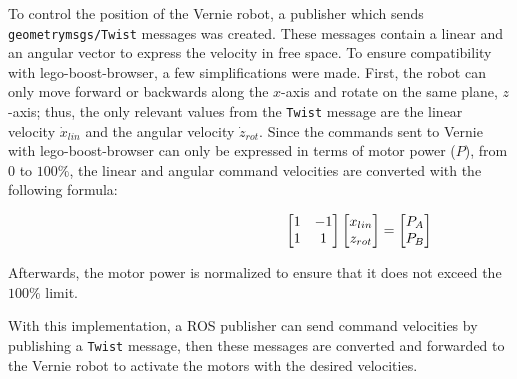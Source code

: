         To control the position of the Vernie robot, a publisher which sends \texttt{geometry\smallunderscore msgs/Twist} messages was created. These messages contain a linear and an angular vector to express the velocity in free space. To ensure compatibility with \textsf{lego-boost-browser}, a few simplifications were made. First, the robot can only move forward or backwards along the $x$-axis and rotate on the same plane, $z$-axis; thus, the only relevant values from the \texttt{Twist} message are the linear velocity $\dot{x}_{lin}$ and the angular velocity $\dot{z}_{rot}$. Since the commands sent to Vernie with \textsf{lego-boost-browser} can only be expressed in terms of motor power ($P$), from 0 to $100\%$, the linear and angular command velocities are converted with the following formula:
        
        \begin{equation}
            \hskip 5cm
            \begin{bmatrix}
                1 & -1 \\
                1 & 1
            \end{bmatrix}
            \begin{bmatrix}
                x_{lin} \\
                z_{rot}
            \end{bmatrix}
            =
            \begin{bmatrix}
                P_A \\
                P_B
            \end{bmatrix}
        \end{equation}

        Afterwards, the motor power is normalized to ensure that it does not exceed the $100\%$ limit. 
        
        With this implementation, a \ac{ROS} publisher can send command velocities by publishing a \texttt{Twist} message, then these messages are converted and forwarded to the Vernie robot to activate the motors with the desired velocities.

